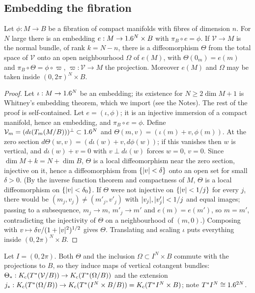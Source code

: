 \subsection{Embedding the fibration}
\begin{lemma}\label{families:lem:embedding}
  Let $\phi:M\to B$ be a fibration of compact manifolds with fibres of
  dimension $n$. For $N$ large there is an embedding $e:M\to1.6^N\times B$ with
  $\pi_B\circ e=\phi$. If $\mathcal V\to M$ is the normal bundle, of rank
  $k=N-n$, there is a diffeomorphism $\Theta$ from the total space of
  $\mathcal V$ onto an open neighbourhood $\Omega$ of $e(M)$, with
  $\Theta(0_m)=e(m)$ and $\pi_B\circ\Theta=\phi\circ\varpi$, $\varpi:\mathcal
  V\to M$ the projection. Moreover $e(M)$ and $\Omega$ may be taken inside
  $(0,2\pi)^N\times B$.
\end{lemma}
\begin{proof}
  Let $\iota:M\to1.6^N$ be an embedding; its existence for $N\ge2\dim M+1$ is
  Whitney's embedding theorem, which we import (see the Notes). The rest of the
  proof is self-contained. Let $e=(\iota,\phi)$; it is an
  injective immersion of a compact manifold, hence an embedding, and
  $\pi_B\circ e=\phi$. Define $\mathcal V_m=(d\iota(T_m(M/B)))^\perp\subset1.6^N$
  and $\Theta(m,v)=(\iota(m)+v,\phi(m))$. At the zero section $d\Theta(w,v)=
  (d\iota(w)+v,d\phi(w))$; if this vanishes then $w$ is vertical, and
  $d\iota(w)+v=0$ with $v\perp d\iota(w)$ forces $w=0$, $v=0$. Since
  $\dim M+k=N+\dim B$, $\Theta$ is a local diffeomorphism near the zero
  section, injective on it, hence a
  diffeomorphism from $\{\lvert v\rvert<\delta\}$ onto an open set for small
  $\delta>0$. (By the inverse function theorem and compactness of $M$, $\Theta$ is a
  local diffeomorphism on $\{\lvert v\rvert<\delta_0\}$. If $\Theta$ were not injective
  on $\{\lvert v\rvert<1/j\}$ for every $j$, there would be $(m_j,v_j)\ne(m'_j,v'_j)$
  with $\lvert v_j\rvert,\lvert v'_j\rvert<1/j$ and equal images; passing to a subsequence,
  $m_j\to m$, $m'_j\to m'$ and $e(m)=e(m')$, so $m=m'$, contradicting the
  injectivity of $\Theta$ on a neighbourhood of $(m,0)$.) Composing with
  $v\mapsto\delta v/(1+\lvert v\rvert^2)^{1/2}$ gives $\Theta$. Translating and scaling
  $\iota$ puts everything inside $(0,2\pi)^N\times B$.
\end{proof}

Let $I=(0,2\pi)$. Both $\Theta$ and the inclusion $\Omega\subset I^N\times B$
commute with the projections to $B$, so they induce maps of vertical cotangent
bundles: $\Theta_*:K_{\mathrm{c}}(T^*(\mathcal V/B))\to K_{\mathrm{c}}(T^*(\Omega/B))$ and the
extension
$j_*:K_{\mathrm{c}}(T^*(\Omega/B))\to K_{\mathrm{c}}(T^*(I^N\times B/B))=K_{\mathrm{c}}(T^*I^N\times B)$; note
$T^*I^N\cong1.6^{2N}$.

